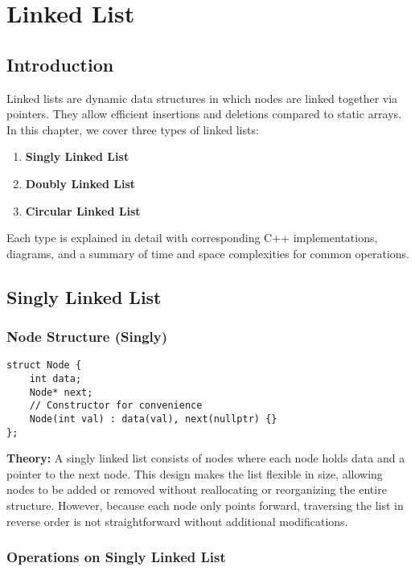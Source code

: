 \chapter{Linked List}

\section*{Introduction}
Linked lists are dynamic data structures in which nodes are linked together via pointers. They allow efficient insertions and deletions compared to static arrays. In this chapter, we cover three types of linked lists:
\begin{enumerate}
  \item \textbf{Singly Linked List}
  \item \textbf{Doubly Linked List}
  \item \textbf{Circular Linked List}
\end{enumerate}
Each type is explained in detail with corresponding C++ implementations, diagrams, and a summary of time and space complexities for common operations.

\section{Singly Linked List}

\subsection{Node Structure (Singly)}
\begin{lstlisting}[style=cppstyle, caption={Singly Linked List Node Structure in C++}]
struct Node {
    int data;
    Node* next;
    // Constructor for convenience
    Node(int val) : data(val), next(nullptr) {}
};
\end{lstlisting}

\textbf{Theory:} A singly linked list consists of nodes where each node holds data and a pointer to the next node. This design makes the list flexible in size, allowing nodes to be added or removed without reallocating or reorganizing the entire structure. However, because each node only points forward, traversing the list in reverse order is not straightforward without additional modifications.

\subsection{Operations on Singly Linked List}
